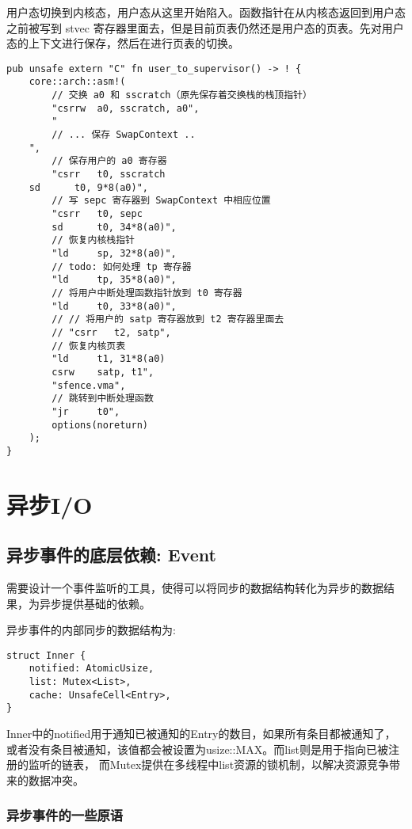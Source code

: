 用户态切换到内核态，用户态从这里开始陷入。函数指针在从内核态返回到用户态之前被写到 stvec 寄存器里面去，但是目前页表仍然还是用户态的页表。先对用户态的上下文进行保存，然后在进行页表的切换。

\begin{lstlisting}[caption=由用户态进入内核态]
pub unsafe extern "C" fn user_to_supervisor() -> ! {
    core::arch::asm!(
        // 交换 a0 和 sscratch（原先保存着交换栈的栈顶指针）
        "csrrw  a0, sscratch, a0",
        "
        // ... 保存 SwapContext ..
    ",
        // 保存用户的 a0 寄存器
        "csrr   t0, sscratch
    sd      t0, 9*8(a0)",
        // 写 sepc 寄存器到 SwapContext 中相应位置
        "csrr   t0, sepc
        sd      t0, 34*8(a0)",
        // 恢复内核栈指针
        "ld     sp, 32*8(a0)",
        // todo: 如何处理 tp 寄存器
        "ld     tp, 35*8(a0)",
        // 将用户中断处理函数指针放到 t0 寄存器
        "ld     t0, 33*8(a0)",
        // // 将用户的 satp 寄存器放到 t2 寄存器里面去
        // "csrr   t2, satp",
        // 恢复内核页表
        "ld     t1, 31*8(a0)
        csrw    satp, t1",
        "sfence.vma",
        // 跳转到中断处理函数
        "jr     t0",
        options(noreturn)
    );
}
\end{lstlisting}


\section{异步I/O}

\subsection{异步事件的底层依赖: Event}

需要设计一个事件监听的工具，使得可以将同步的数据结构转化为异步的数据结果，为异步提供基础的依赖。

异步事件的内部同步的数据结构为:

\begin{lstlisting}[caption=异步事件底层的同步结构]
struct Inner {
    notified: AtomicUsize,
    list: Mutex<List>,
    cache: UnsafeCell<Entry>,
}
\end{lstlisting}

Inner中的notified用于通知已被通知的Entry的数目，如果所有条目都被通知了，或者没有条目被通知，该值都会被设置为usize::MAX。而list则是用于指向已被注册的监听的链表， 而Mutex提供在多线程中list资源的锁机制，以解决资源竞争带来的数据冲突。

\subsubsection{异步事件的一些原语}
\label{sssec:event}

